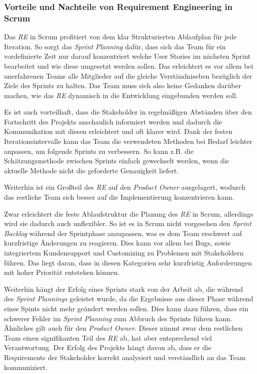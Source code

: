 \documentclass[acmtog]{acmart}
\begin{document}
\subsubsection{Vorteile und Nachteile von Requirement Engineering in Scrum}

Das \emph{RE} in Scrum profitiert von dem klar Strukturierten Ablaufplan für jede Iteration. So sorgt das \emph{Sprint Planning} dafür, dass sich das
Team für ein vordefinierte Zeit nur darauf konzentriert welche User Stories im nächsten Sprint bearbeitet und wie diese umgesetzt werden sollen. Das erleichtert es vor
allem bei unerfahrenen Teams alle Mitglieder auf die gleiche Verständniseben bezüglich der Ziele des Sprints zu halten. Das Team muss sich
also keine Gedanken darüber machen, wie das \emph{RE} dynamisch in die Entwicklung eingebunden werden soll.

Es ist auch vorteilhaft, dass die Stakeholder in regelmäßigen Abständen über den Fortschritt des Projekts anschaulich informiert werden und
dadurch die Kommunikation mit diesen erleichtert und oft klarer wird. Dank der festen Iterationsintervalle kann das Team die verwendeten
Methoden bei Bedarf leichter anpassen, um folgende Sprints zu verbessern. So kann z.B. die Schätzungsmethode zwischen Sprints einfach gewechselt
werden, wenn die aktuelle Methode nicht die geforderte Genauigkeit liefert.

Weiterhin ist ein Großteil des \emph{RE} auf den \emph{Product Owner} ausgelagert, wodurch das restliche Team sich besser auf die Implementierung konzentrieren kann.

Zwar erleichtert die feste Ablaufstruktur die Planung des \emph{RE} in Scrum, allerdings wird sie dadurch auch unflexibler. So ist es in Scrum nicht
vorgesehen den \emph{Sprint Backlog} während der Sprintphase anzupassen, was es dem Team erschwert auf kurzfristige Änderungen zu reagieren. Dies
kann vor allem bei Bugs, sowie integriertem Kundensupport und Customizing zu Problemen mit Stakeholdern führen. Das liegt daran, dass in
diesen Kategorien sehr kurzfristig Anforderungen mit hoher Priorität entstehen können.

Weiterhin hängt der Erfolg eines Sprints stark von der Arbeit ab, die während des \emph{Sprint Plannings} geleistet wurde, da die Ergebnisse aus
dieser Phase während eines Spints nicht mehr geändert werden sollen. Dies kann dazu führen, dass ein schwerer Fehler im \emph{Sprint Planning} zum
Abbruch des Sprints führen kann. Ähnliches gilt auch für den \emph{Product Owner}. Dieser nimmt zwar dem restlichen Team einen signifikanten Teil
des \emph{RE} ab, hat aber entsprechend viel Verantwortung. Der Erfolg des Projekts hängt davon ab, dass er die Requirements der Stakeholder korrekt
analysiert und verständlich an das Team kommuniziert.
\end{document}
